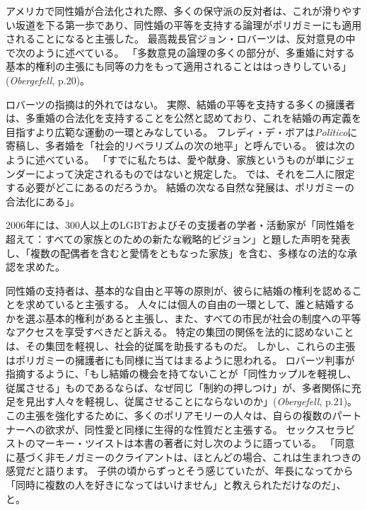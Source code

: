 \documentclass[paper=a4,book,openany]{jlreq}
\newcommand{\ig}[1]{}           %
\begin{document}
アメリカで同性婚が合法化された際、多くの保守派の反対者は、これが滑りやすい坂道を下る第一歩であり、同性婚の平等を支持する論理がポリガミーにも適用されることになると主張した。
最高裁長官ジョン・ロバーツ\ig{John Roberts}は、反対意見の中で次のように述べている。
「多数意見の論理の多くの部分が、多重婚に対する基本的権利の主張にも同等の力をもって適用されることははっきりしている」(\emph{Obergefell}, p.20)。

ロバーツ\ig{John Roberts}の指摘は的外れではない。
実際、結婚の平等を支持する多くの擁護者は、多重婚の合法化を支持することを公然と認めており、これを結婚の再定義を目指すより広範な運動の一環とみなしている。
フレディ・デ・ボアは\emph{Politico}に寄稿し、多者婚を「社会的リベラリズムの次の地平」と呼んでいる。
彼は次のように述べている。
「すでに私たちは、愛や献身、家族というものが単にジェンダーによって決定されるものではないと規定した。
では、それを二人に限定する必要がどこにあるのだろうか。
結婚の次なる自然な発展は、ポリガミーの合法化にある」\citep{deboer15:_it_time_legal_polyg}。

2006年には、300人以上のLGBTおよびその支援者の学者・活動家が「同性婚を超えて：すべての家族とのための新たな戦略的ビジョン」と題した声明を発表し、「複数の配偶者を含むと愛情をともなった家族」を含む、多様なの法的な承認を求めた\citep{MR06:_beyon_same_sex_marriag}。

同性婚の支持者は、基本的な自由と平等の原則が、彼らに結婚の権利を認めることを求めていると主張する。
人々には個人の自由の一環として、誰と結婚するかを選ぶ基本的権利があると主張し、また、すべての市民が社会の制度への平等なアクセスを享受すべきだと訴える。
特定の集団の関係を法的に認めないことは、その集団を軽視し、社会的従属を助長するものだ。
しかし、これらの主張はポリガミーの擁護者にも同様に当てはまるように思われる。
ロバーツ判事\ig{John Roberts}が指摘するように、「もし結婚の機会を持てないことが「同性カップルを軽視し、従属させる」ものであるならば、なぜ同じ「制約の押しつけ」が、多者関係に充足を見出す人々を軽視し、従属させることにならないのか」(\emph{Obergefell}, p.21)。
この主張を強化するために、多くのポリアモリーの人々は、自らの複数のパートナーへの欲求が、同性愛と同様に生得的な性質だと主張する。
セックスセラピストのマーキー・ツイストは本書の著者に対し次のように語っている。
「同意に基づく非モノガミーのクライアントは、ほとんどの場合、これは生まれつきの感覚だと語ります。
子供の頃からずっとそう感じていたが、年長になってから「同時に複数の人を好きになってはいけません」と教えられただけなのだ」、と\citep{mcarthur16:_why_peopl_are_fight_get}。
\end{document}
